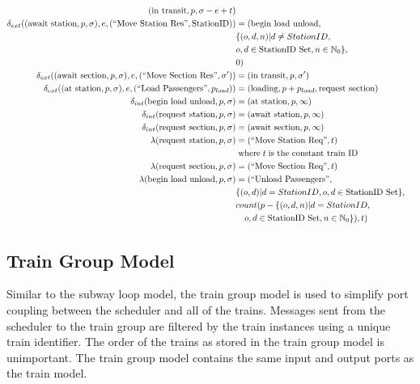 \begin{align*}
        (\text{in transit}, p, \sigma - e + t) \\
    \delta_{ext}((\text{await station}, p, \sigma), e, (\text{``Move Station Res''}, \text{StationID})) &= (\text{begin load unload}, \\
        & \{ (o, d, n) | d \neq StationID, \\
        & o, d \in \text{StationID Set}, n \in \mathbb{N}_0 \}, \\
        & 0) \\
    \delta_{ext}((\text{await section}, p, \sigma), e, (\text{``Move Section Res''}, \sigma')) &= (\text{in transit}, p, \sigma') \\
    \delta_{ext}((\text{at station}, p, \sigma), e, (\text{``Load Passengers''}, p_{load})) &=
        (\text{loading}, p + p_{load}, \text{request section}) \\
    \delta_{int}(\text{begin load unload}, p, \sigma) &= 
        (\text{at station}, p, \infty) \\
    \delta_{int}(\text{request station}, p, \sigma) &= 
        (\text{await station}, p, \infty) \\
    \delta_{int}(\text{request section}, p, \sigma) &= 
        (\text{await section}, p, \infty) \\
    \lambda(\text{request station}, p, \sigma) &= (\text{``Move Station Req''}, t) \\ 
        & \text{\;where\;} t \text{\;is the constant train ID} \\
    \lambda(\text{request section}, p, \sigma) &= (\text{``Move Section Req''}, t) \\ 
    \lambda(\text{begin load unload}, p, \sigma) &= (\text{``Unload Passengers''},  \\
        & \{ (o, d) | d = StationID, o, d \in \text{StationID Set} \}, \\ 
        & count(p - \{ (o, d, n) | d = StationID, \\
        & \quad o, d \in \text{StationID Set}, n \in \mathbb{N}_0 \}), t)
\end{align*}
%
\subsection{Train Group Model}
Similar to the subway loop model, the train group model is used to simplify port coupling between the scheduler and all of the trains.  Messages sent from the scheduler to the train group are filtered by the train instances using a unique train identifier.  The order of the trains as stored in the train group model is unimportant.  The train group model contains the same input and output ports as the train model.

